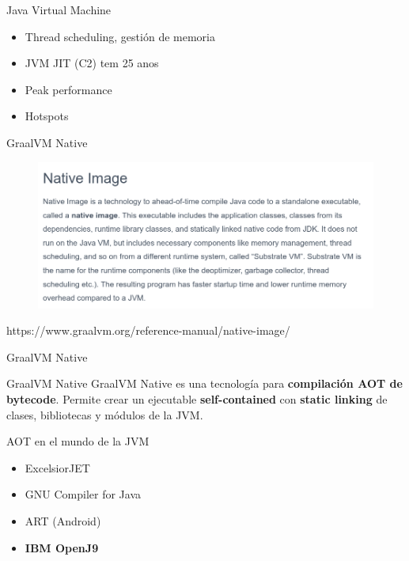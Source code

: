 \documentclass[aspectratio=169]{beamer}
\begin{document}
\begin{frame}{Java Virtual Machine}

	\begin{itemize}
		\item Thread scheduling, gestión de memoria
		\item JVM JIT (C2) tem 25 anos
		\item Peak performance
		\item Hotspots
	\end{itemize}

\end{frame}


\begin{frame}{GraalVM Native}
	\begin{figure}
		\centering
		\includegraphics[width=\linewidth]{Images/nativeimagedefinition.png}
	\end{figure}
{\tiny https://www.graalvm.org/reference-manual/native-image/}
\end{frame}


\begin{frame}{GraalVM Native}

	\begin{exampleblock}{GraalVM Native}
	GraalVM Native es una tecnología para \textbf{compilación AOT de bytecode}. Permite crear un ejecutable \textbf{self-contained} con \textbf{static linking} de clases, bibliotecas y módulos de la JVM.
	\end{exampleblock}

\end{frame}




\begin{frame}{AOT en el mundo de la JVM}
	\begin{itemize}
		\item ExcelsiorJET
		\item GNU Compiler for Java
		\item ART (Android)
		\item \textbf{IBM OpenJ9}
	\end{itemize}

\end{frame}
\end{document}
